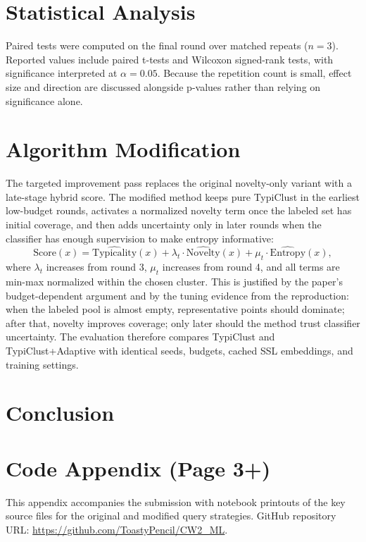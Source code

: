 \documentclass[10pt,a4paper,twocolumn]{article}
\begin{document}
\section{Statistical Analysis}
Paired tests were computed on the final round over matched repeats (\(n=3\)). Reported values include paired t-tests and Wilcoxon signed-rank tests, with significance interpreted at \(\alpha=0.05\). Because the repetition count is small, effect size and direction are discussed alongside p-values rather than relying on significance alone.

\section{Algorithm Modification}
The targeted improvement pass replaces the original novelty-only variant with a late-stage hybrid score. The modified method keeps pure TypiClust in the earliest low-budget rounds, activates a normalized novelty term once the labeled set has initial coverage, and then adds uncertainty only in later rounds when the classifier has enough supervision to make entropy informative:
\[
\text{Score}(x)=\widehat{\text{Typicality}}(x)+\lambda_t \cdot \widehat{\text{Novelty}}(x)+\mu_t \cdot \widehat{\text{Entropy}}(x),
\]
where \(\lambda_t\) increases from round 3, \(\mu_t\) increases from round 4, and all terms are min-max normalized within the chosen cluster. This is justified by the paper's budget-dependent argument and by the tuning evidence from the reproduction: when the labeled pool is almost empty, representative points should dominate; after that, novelty improves coverage; only later should the method trust classifier uncertainty. The evaluation therefore compares TypiClust and TypiClust+Adaptive with identical seeds, budgets, cached SSL embeddings, and training settings.

\section{Conclusion}




\onecolumn
\newpage
\section*{Code Appendix (Page 3+)}
This appendix accompanies the submission with notebook printouts of the key source files for the original and modified query strategies.
GitHub repository URL: \url{https://github.com/ToastyPencil/CW2_ML}.

\end{document}
